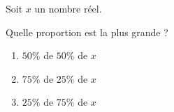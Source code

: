 \begin{exo}{}
	Soit $x$ un nombre réel.

	Quelle proportion est la plus grande ?
	\begin{enumerate}
		\item $50\%$ de $50\%$ de $x$
		\item $75\%$ de $25\%$ de $x$
		\item $25\%$ de $75\%$ de $x$
	\end{enumerate}
\end{exo}
